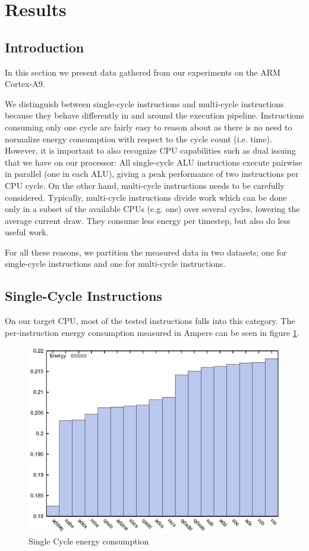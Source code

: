 \section{Results}

\subsection{Introduction}
In this section we present data gathered from our experiments on the ARM
Cortex-A9.

We distinguish between single-cycle instructions and multi-cycle instructions
because they behave differently in and around the execution pipeline.
Instructions consuming only one cycle are fairly easy to reason about as there
is no need to normalize energy consumption with respect to the cycle count (i.e.
time). However, it is important to also recognize CPU capabilities such as dual
issuing that we have on our processor: All single-cycle ALU instructions execute
pairwise in parallel (one in each ALU), giving a peak performance of two
instructions per CPU cycle. On the other hand, multi-cycle instructions needs to
be carefully considered. Typically, multi-cycle instructions divide work which
can be done only in a subset of the available CPUs (e.g. one) over several
cycles, lowering the average current draw. They consume less energy per
timestep, but also do less useful work.

For all these reasons, we partition the measured data in two datasets; one for
single-cycle instructions and one for multi-cycle instructions.

\subsection{Single-Cycle Instructions}
On our target CPU, most of  the tested instructions falls into
this category. The per-instruction energy consumption measured in Ampere can be
seen in figure \ref{fig:singlecycle}.

\begin{figure}
    \includegraphics[width=\textwidth/2]{figures/single-cycle}
    \caption{Single Cycle energy consumption}
    \label{fig:singlecycle}
\end{figure}

